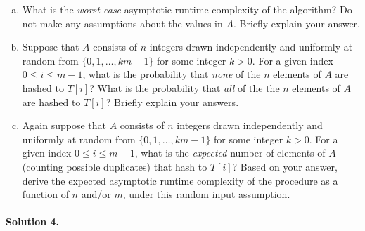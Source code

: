 \documentclass[11pt]{article}
\begin{document}
\begin{enumerate}[(a)]
    \item What is the \textit{worst-case} asymptotic runtime complexity of the  algorithm? Do not make any assumptions about the values in $A$. Briefly explain your answer.
    
    \item Suppose that $A$ consists of $n$ integers drawn independently and uniformly at random from $\{0,1,\dots,km-1\}$ for some integer $k>0$. For a given index $0 \leq i \leq m-1$,  what is the probability that \textit{none} of the $n$ elements of $A$ are hashed to $T[i]$? What is the probability that \textit{all} of the the $n$ elements of $A$ are hashed to $T[i]$? Briefly explain your answers.

    \item Again suppose that $A$ consists of $n$ integers drawn independently and uniformly at random from $\{0,1,\dots,km-1\}$ for some integer $k>0$. For a given index $0 \leq i \leq m-1$, what is the \textit{expected} number of elements of $A$ (counting possible duplicates) that hash to $T[i]$? Based on your answer, derive the expected asymptotic runtime complexity of the  procedure as a function of $n$ and/or $m$, under this random input assumption.
\end{enumerate}

\paragraph{Solution 4.}
\end{document}

